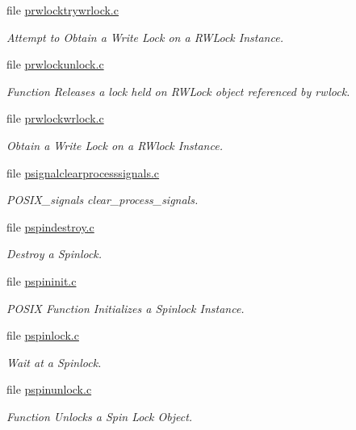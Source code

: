 \begin{DoxyCompactItemize}
file \mbox{\hyperlink{prwlocktrywrlock_8c}{prwlocktrywrlock.\+c}}
\begin{DoxyCompactList}\small\item\em Attempt to Obtain a Write Lock on a R\+W\+Lock Instance. \end{DoxyCompactList}\item 
file \mbox{\hyperlink{prwlockunlock_8c}{prwlockunlock.\+c}}
\begin{DoxyCompactList}\small\item\em Function Releases a lock held on R\+W\+Lock object referenced by rwlock. \end{DoxyCompactList}\item 
file \mbox{\hyperlink{prwlockwrlock_8c}{prwlockwrlock.\+c}}
\begin{DoxyCompactList}\small\item\em Obtain a Write Lock on a R\+Wlock Instance. \end{DoxyCompactList}\item 
file \mbox{\hyperlink{psignalclearprocesssignals_8c}{psignalclearprocesssignals.\+c}}
\begin{DoxyCompactList}\small\item\em P\+O\+S\+I\+X\+\_\+signals clear\+\_\+process\+\_\+signals. \end{DoxyCompactList}\item 
file \mbox{\hyperlink{pspindestroy_8c}{pspindestroy.\+c}}
\begin{DoxyCompactList}\small\item\em Destroy a Spinlock. \end{DoxyCompactList}\item 
file \mbox{\hyperlink{pspininit_8c}{pspininit.\+c}}
\begin{DoxyCompactList}\small\item\em P\+O\+S\+IX Function Initializes a Spinlock Instance. \end{DoxyCompactList}\item 
file \mbox{\hyperlink{pspinlock_8c}{pspinlock.\+c}}
\begin{DoxyCompactList}\small\item\em Wait at a Spinlock. \end{DoxyCompactList}\item 
file \mbox{\hyperlink{pspinunlock_8c}{pspinunlock.\+c}}
\begin{DoxyCompactList}\small\item\em Function Unlocks a Spin Lock Object. \end{DoxyCompactList}\item 

\end{DoxyCompactItemize}
